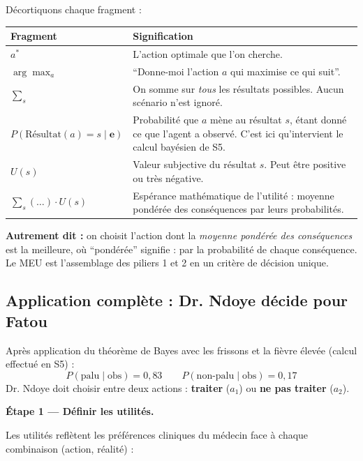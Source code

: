 \documentclass[11pt,a4paper]{article}
\begin{document}
Décortiquons chaque fragment :

\begin{center}
\renewcommand{\arraystretch}{1.5}
\begin{tabular}{>{\ttfamily}lp{10.5cm}}
\toprule
\textbf{Fragment} & \textbf{Signification} \\
\midrule
$a^*$ & L'action optimale que l'on cherche. \\
$\arg\max_a$ & ``Donne-moi l'action $a$ qui maximise ce qui suit''. \\
$\sum_s$ & On somme sur \textit{tous} les résultats possibles. Aucun scénario n'est ignoré. \\
$P(\mathrm{Résultat}(a)=s \mid \mathbf{e})$ & Probabilité que $a$ mène au résultat $s$, étant donné ce que l'agent a observé. C'est ici qu'intervient le calcul bayésien de S5. \\
$U(s)$ & Valeur subjective du résultat $s$. Peut être positive ou très négative. \\
$\sum_s (\ldots) \cdot U(s)$ & Espérance mathématique de l'utilité : moyenne pondérée des conséquences par leurs probabilités. \\
\bottomrule
\end{tabular}
\end{center}

\textbf{Autrement dit :} on choisit l'action dont la \textit{moyenne pondérée des conséquences} est la meilleure, où ``pondérée'' signifie : par la probabilité de chaque conséquence. Le MEU est l'assemblage des piliers 1 et 2 en un critère de décision unique.

\subsection{Application complète : Dr. Ndoye décide pour Fatou}

\begin{exemplebox}
Après application du théorème de Bayes avec les frissons et la fièvre élevée (calcul effectué en S5) :
$$P(\text{palu} \mid \text{obs}) = 0{,}83 \qquad P(\text{non-palu} \mid \text{obs}) = 0{,}17$$
Dr. Ndoye doit choisir entre deux actions : \textbf{traiter} ($a_1$) ou \textbf{ne pas traiter} ($a_2$).
\end{exemplebox}

\medskip
\textbf{Étape 1 --- Définir les utilités.}

Les utilités reflètent les préférences cliniques du médecin face à chaque combinaison (action, réalité) :
\end{document}
